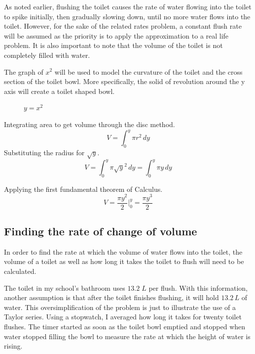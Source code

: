 \documentclass[12pt, titlepage]{article}
\begin{document}
As noted earlier, flushing the toilet causes the rate of water flowing into the toilet to spike initially, then gradually slowing down, until no more water flows into the toilet. However, for the sake of the related rates problem, a constant flush rate will be assumed as the priority is to apply the approximation to a real life problem. It is also important to note that the volume of the toilet is not completely filled with water.  

The graph of \(x^{2}\) will be used to model the curvature of the toilet and the cross section of the toilet bowl. More specifically, the solid of revolution around the y axis will create a toilet shaped bowl. 

\begin{figure}[H]
\centering
    \caption[]{\(y=x^2\)}
\end{figure}

Integrating area to get volume through the disc method.
\begin{equation*}
    V = \int^y_0 \pi r^2\,dy
\end{equation*}
Substituting the radius for \(\sqrt{y}\).
\begin{equation*}
    V = \int^y_0 \pi \sqrt{y}^2\,dy  = \int^y_0 \pi y\,dy 
\end{equation*}

Applying the first fundamental theorem of Calculus.
\begin{equation*}
    V = \frac{ \pi y^2 }{2} \biggr \rvert^y_0 = \frac{\pi y^3}{2}
\end{equation*}

\subsection{Finding the rate of change of volume}
In order to find the rate at which the volume of water flows into the toilet, the volume of a toilet as well as how long it takes the toilet to flush will need to be calculated. 

The toilet in my school's bathroom uses \(13.2 \; L\) per flush. With this information, another assumption is that after the toilet finishes flushing, it will hold \(13.2 \, L\) of water. This oversimplification of the problem is just to illustrate the use of a Taylor series. Using a stopwatch, I averaged how long it takes for twenty toilet flushes. The timer started as soon as the toilet bowl emptied and stopped when water stopped filling the bowl to measure the rate at which the height of water is rising.
\end{document}
